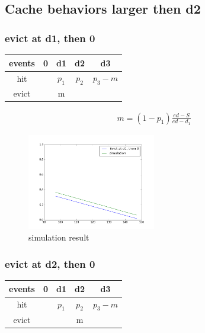 \documentclass[12pt, letterpaper]{article}
\begin{document}
\subsection{Cache behaviors larger then d2}

\subsubsection{evict at d1, then 0}

\begin{center}
\begin{tabular}{c | c c c c}
\hline
events & 0 & d1 & d2 & d3 \\
\hline
hit & & $p_1$& $p_2$ & $p_3-m$ \\
evict & & m &  & 
\end{tabular}
\end{center}

\begin{equation}
\begin{aligned}
m  = (1-p_1) \frac{ed - S}{ed - d_1}
\end{aligned}
\end{equation}

\begin{figure}[H]
\centering
\includegraphics[width=0.5\textwidth]{sim_d1_3.png}
\caption{simulation result}
\end{figure}

\subsubsection{evict at d2, then 0}

\begin{center}
\begin{tabular}{c | c c c c}
\hline
events & 0 & d1 & d2 & d3 \\
\hline
hit & & $p_1$& $p_2$ & $p_3-m$ \\
evict & &  & m & 
\end{tabular}
\end{center}
\end{document}
